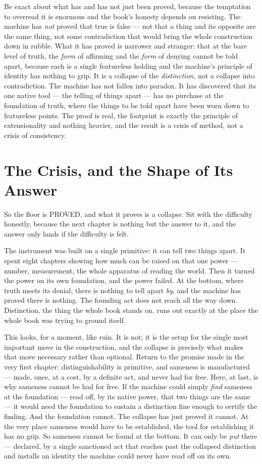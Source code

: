 Be exact about what has and has not just been proved, because the temptation to overread it is enormous and the
book's honesty depends on resisting. The machine has \emph{not} proved that true is false --- not that a thing and
its opposite are the same thing, not some contradiction that would bring the whole construction down in rubble.
What it has proved is narrower and stranger: that at the bare level of truth, the \emph{form} of affirming and the
\emph{form} of denying cannot be told apart, because each is a single featureless holding and the machine's
principle of identity has nothing to grip. It is a collapse of the \emph{distinction}, not a collapse into
contradiction. The machine has not fallen into paradox. It has discovered that its one native tool --- the telling
of things apart --- has no purchase at the foundation of truth, where the things to be told apart have been worn
down to featureless points. The proof is real, the footprint is exactly the principle of extensionality and
nothing heavier, and the result is a crisis of method, not a crisis of consistency.

\section{The Crisis, and the Shape of Its Answer}

So the floor is PROVED, and what it proves is a collapse. Sit with the difficulty honestly, because the next
chapter is nothing but the answer to it, and the answer only lands if the difficulty is felt.

The instrument was built on a single primitive: it can tell two things apart. It spent eight chapters showing how
much can be raised on that one power --- number, measurement, the whole apparatus of reading the world. Then it
turned the power on its own foundation, and the power failed. At the bottom, where truth meets its denial, there
is nothing to tell apart \emph{by}, and the machine has proved there is nothing. The founding act does not reach
all the way down. Distinction, the thing the whole book stands on, runs out exactly at the place the whole book
was trying to ground itself.

This looks, for a moment, like ruin. It is not; it is the setup for the single most important move in the
construction, and the collapse is precisely what makes that move necessary rather than optional. Return to the
promise made in the very first chapter: distinguishability is primitive, and sameness is manufactured --- made,
once, at a cost, by a definite act, and never had for free. Here, at last, is why sameness cannot be had for free.
If the machine could simply \emph{find} sameness at the foundation --- read off, by its native power, that two
things are the same --- it would need the foundation to sustain a distinction fine enough to certify the finding.
And the foundation cannot. The collapse has just proved it cannot. At the very place sameness would have to be
established, the tool for establishing it has no grip. So sameness cannot be found at the bottom. It can only be
\emph{put} there --- declared, by a single sanctioned act that reaches past the collapsed distinction and installs
an identity the machine could never have read off on its own.

